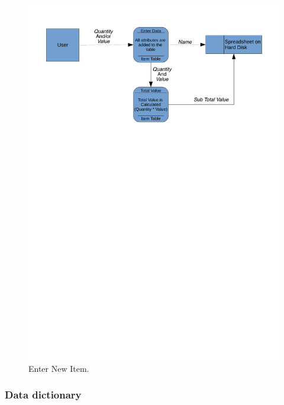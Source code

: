 \begin{figure}[H]
    \includegraphics[width=\textwidth]{./Analysis/Dataflow/New_System/Data_flow_update.pdf}
    \caption{Enter New Item.} \label{fig:print_function_result}
\end{figure}



\subsubsection{Data dictionary}

